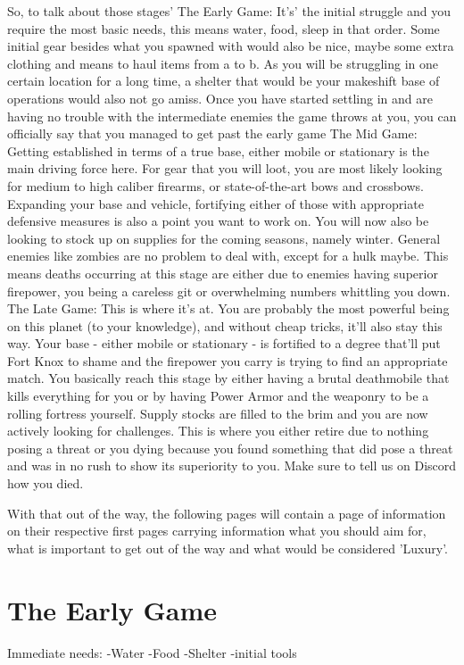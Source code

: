 \documentclass[11pt]{report}
\begin{document}
So, to talk about those stages'
The Early Game:
It's' the initial struggle and you require the most basic needs, this means water, food, sleep in that order. Some initial gear besides what you spawned with would also be nice, maybe some extra clothing and means to haul items from a to b.
As you will be struggling in one certain location for a long time, a shelter that would be your makeshift base of operations would also not go amiss.
Once you have started settling in and are having no trouble with the intermediate enemies the game throws at you, you can officially say that you managed to get past the early game
The Mid Game:
Getting established in terms of a true base, either mobile or stationary is the main driving force here. For gear that you will loot, you are most likely looking for medium to high caliber firearms, or state-of-the-art bows and crossbows. Expanding your base and vehicle, fortifying either of those with appropriate defensive measures is also a point you want to work on. You will now also be looking to stock up on supplies for the coming seasons, namely winter. General enemies like zombies are no problem to deal with, except for a hulk maybe. This means deaths occurring at this stage are either due to enemies having superior firepower, you being a careless git or overwhelming numbers whittling you down.
The Late Game:
This is where it's at. You are probably the most powerful being on this planet (to your knowledge), and without cheap tricks, it'll also stay this way. Your base - either mobile or stationary - is fortified to a degree that'll put Fort Knox to shame and the firepower you carry is trying to find an appropriate match. You basically reach this stage by either having a brutal deathmobile that kills everything for you or by having Power Armor and the weaponry to be a rolling fortress yourself. Supply stocks are filled to the brim and you are now actively looking for challenges. This is where you either retire due to nothing posing a threat or you dying because you found something that did pose a threat and was in no rush to show its superiority to you. Make sure to tell us on Discord how you died.

With that out of the way, the following pages will contain a page of information on their respective first pages carrying information what you should aim for, what is important to get out of the way and what would be considered 'Luxury'.

\section{The Early Game}
Immediate needs:
-Water
-Food
-Shelter
-initial tools
\end{document}
